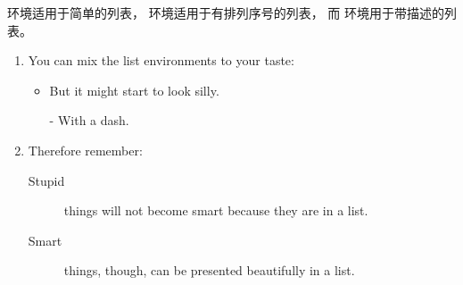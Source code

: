  环境适用于简单的列表， 环境适用于有排列序号的列表， 而  环境用于带描述的列表。 


\begin{example}
\flushleft
\begin{enumerate}
\item You can mix the list
environments to your taste:
\begin{itemize}
\item But it might start to
look silly.
\item[-] With a dash.
\end{itemize}
\item Therefore remember:
\begin{description}
\item[Stupid] things will not
become smart because they are
in a list.
\item[Smart] things, though,
can be presented beautifully
in a list.
\end{description}
\end{enumerate}
\end{example}


